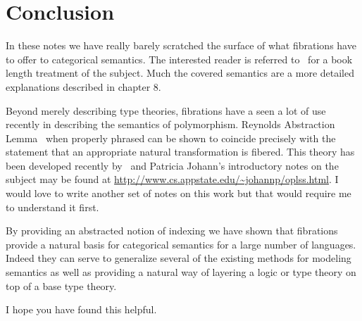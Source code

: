 \section{Conclusion}

In these notes we have really barely scratched the surface of what
fibrations have to offer to categorical semantics. The interested
reader is referred to~\citet{Jacobs:01} for a book length treatment of
the subject. Much the covered semantics are a more detailed
explanations described in chapter 8.

Beyond merely describing type theories, fibrations have a seen a lot
of use recently in describing the semantics of polymorphism. Reynolds
Abstraction Lemma~\cite{Reynolds:84} when properly phrased can be
shown to coincide precisely with the statement that an appropriate
natural transformation is fibered. This theory has been developed
recently by~\citet{Ghani:15} and Patricia Johann's introductory notes
on the subject may be found at
\url{http://www.cs.appstate.edu/~johannp/oplss.html}. I would love to
write another set of notes on this work but that would require me to
understand it first.

By providing an abstracted notion of indexing we have shown that
fibrations provide a natural basis for categorical semantics for a
large number of languages. Indeed they can serve to generalize several
of the existing methods for modeling semantics as well as providing a
natural way of layering a logic or type theory on top of a base type
theory.

I hope you have found this helpful.
